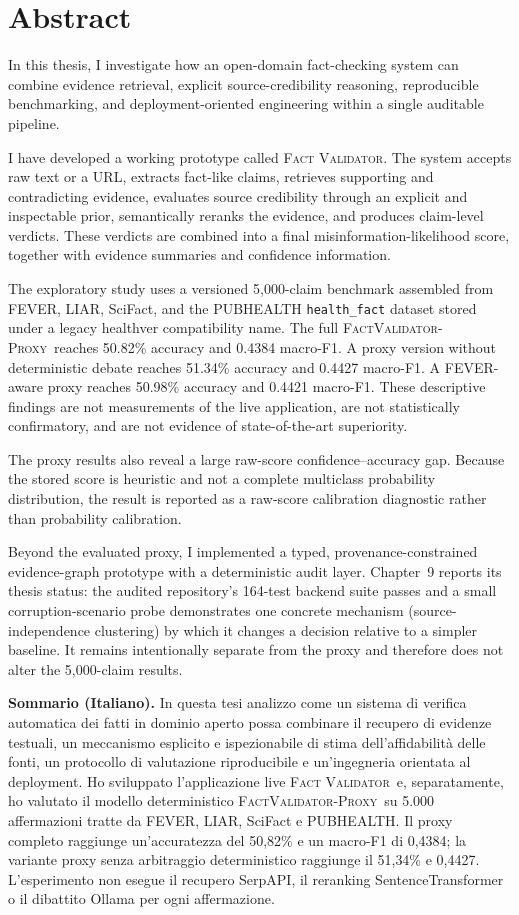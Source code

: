\documentclass[12pt,a4paper,openany]{report}
\newcommand{\system}{\textsc{Fact Validator}}
\newcommand{\proxy}{\textsc{FactValidator-Proxy}}
\begin{document}
\chapter*{Abstract}
In this thesis, I investigate how an open-domain fact-checking system can combine evidence retrieval, explicit source-credibility reasoning, reproducible benchmarking, and deployment-oriented engineering within a single auditable pipeline.

I have developed a working prototype called \system. The system accepts raw text or a URL, extracts fact-like claims, retrieves supporting and contradicting evidence, evaluates source credibility through an explicit and inspectable prior, semantically reranks the evidence, and produces claim-level verdicts. These verdicts are combined into a final misinformation-likelihood score, together with evidence summaries and confidence information.

The exploratory study uses a versioned 5{,}000-claim benchmark assembled from FEVER, LIAR, SciFact, and the PUBHEALTH \texttt{health\_fact} dataset stored under a legacy healthver compatibility name. The full \proxy\ reaches 50.82\% accuracy and 0.4384 macro-F1. A proxy version without deterministic debate reaches 51.34\% accuracy and 0.4427 macro-F1. A FEVER-aware proxy reaches 50.98\% accuracy and 0.4421 macro-F1. These descriptive findings are not measurements of the live application, are not statistically confirmatory, and are not evidence of state-of-the-art superiority.

The proxy results also reveal a large raw-score confidence--accuracy gap. Because the stored score is heuristic and not a complete multiclass probability distribution, the result is reported as a raw-score calibration diagnostic rather than probability calibration.

Beyond the evaluated proxy, I implemented a typed, provenance-constrained evidence-graph prototype with a deterministic audit layer. Chapter~9 reports its thesis status: the audited repository's 164-test backend suite passes and a small corruption-scenario probe demonstrates one concrete mechanism (source-independence clustering) by which it changes a decision relative to a simpler baseline. It remains intentionally separate from the proxy and therefore does not alter the 5{,}000-claim results.

\textbf{Sommario (Italiano).} In questa tesi analizzo come un sistema di verifica automatica dei fatti in dominio aperto possa combinare il recupero di evidenze testuali, un meccanismo esplicito e ispezionabile di stima dell'affidabilit\`a delle fonti, un protocollo di valutazione riproducibile e un'ingegneria orientata al deployment. Ho sviluppato l'applicazione live \system\ e, separatamente, ho valutato il modello deterministico \proxy\ su 5.000 affermazioni tratte da FEVER, LIAR, SciFact e PUBHEALTH. Il proxy completo raggiunge un'accuratezza del 50{,}82\% e un macro-F1 di 0{,}4384; la variante proxy senza arbitraggio deterministico raggiunge il 51{,}34\% e 0{,}4427. L'esperimento non esegue il recupero SerpAPI, il reranking SentenceTransformer o il dibattito Ollama per ogni affermazione.
\end{document}
